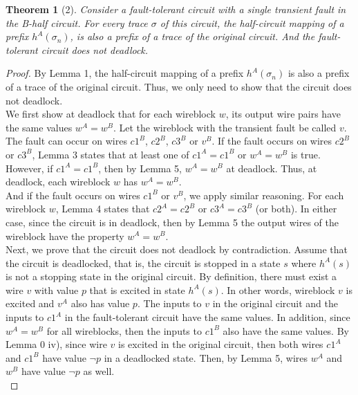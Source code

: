 \documentclass[12pt]{report}
\newtheorem*{theorem}{Theorem}
\begin{document}
\begin{theorem}[2]
Consider a fault-tolerant circuit with a single transient fault in the B-half circuit.  For every trace $\sigma$ of this circuit, the half-circuit mapping of a prefix $h^{A}(\sigma_n)$, is also a prefix of a trace of the original circuit.  And the fault-tolerant circuit does not deadlock.  
\end{theorem}
\begin{proof}
By Lemma 1, the half-circuit mapping of a prefix $h^{A}(\sigma_n)$ is also a prefix of a trace of the original circuit.  Thus, we only need to show that the circuit does not deadlock.\\

We first show at deadlock that for each wireblock $w$, its output wire pairs have the same values $w^A = w^B$.  Let the wireblock with the transient fault be called $v$. The fault can occur on wires $c1^B$, $c2^B$, $c3^B$ or $v^B$.  If the fault occurs on wires $c2^B$ or $c3^B$, Lemma 3 states that at least one of $c1^A=c1^B$ or $w^A=w^B$ is true.  However, if $c1^A=c1^B$, then by Lemma 5, $w^A = w^B$ at deadlock.  Thus, at deadlock, each wireblock $w$ has $w^A = w^B$.\\

And if the fault occurs on wires $c1^B$ or $v^B$, we apply similar reasoning.  For each wireblock $w$, Lemma 4 states that $c2^A=c2^B$ or $c3^A=c3^B$ (or both).  In either case, since the circuit is in deadlock, then by Lemma 5 the output wires of the wireblock have the property $w^A = w^B$. \\%

Next, we prove that the circuit does not deadlock by contradiction.  Assume that the circuit is deadlocked, that is, the circuit is stopped in a state $s$ where $h^A(s)$ is not a stopping state in the original circuit.  By definition, there must exist a wire $v$ with value $p$ that is excited in state $h^A(s)$.  In other words, wireblock $v$ is excited and $v^A$ also has value $p$. 
The inputs to $v$ in the original circuit and the inputs to $c1^A$ in the fault-tolerant circuit have the same values.  In addition, since $w^A = w^B$ for all wireblocks, then the inputs to $c1^B$ also have the same values.  
By Lemma 0 iv), since wire $v$ is excited in the original circuit, then both wires $c1^A$ and $c1^B$ have value $\neg{p}$ in a deadlocked state.  Then, by Lemma 5, wires $w^{A}$ and $w^B$ have value $\neg{p}$ as well.   \\


\end{proof}
\end{document}
